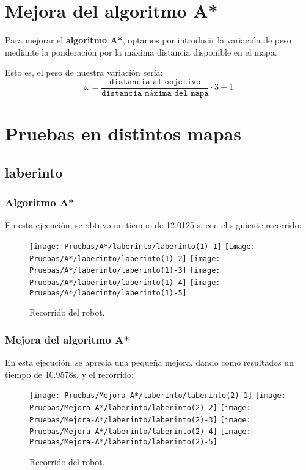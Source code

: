 \documentclass[a4paper, 11pt]{article}
\begin{document}
\section{Mejora del algoritmo A*}
	Para mejorar el \textbf{algoritmo A*}, optamos por introducir la variación de peso mediante la
	ponderación por la máxima distancia disponible en el mapa.
	
	Esto es, el peso de nuestra variación sería:
	$$\omega = \frac{\texttt{distancia al objetivo}}{\texttt{distancia máxima del mapa}} \cdot 3 + 1$$

\section{Pruebas en distintos mapas}
	\subsection{laberinto}
		\subsubsection{Algoritmo A*}
			En esta ejecución, se obtuvo un tiempo de 12.0125 s. con el siguiente recorrido:
			\begin{figure}[H]
				\centering
				\texttt{[image: Pruebas/A*/laberinto/laberinto(1)-1]}
				\texttt{[image: Pruebas/A*/laberinto/laberinto(1)-2]}
				\texttt{[image: Pruebas/A*/laberinto/laberinto(1)-3]}
				\texttt{[image: Pruebas/A*/laberinto/laberinto(1)-4]}
				\texttt{[image: Pruebas/A*/laberinto/laberinto(1)-5]}
				\caption{Recorrido del robot.}
				\label{A-lab}
			\end{figure}
			
		\subsubsection{Mejora del algoritmo A*}
			En esta ejecución, se aprecia una pequeña mejora, dando como resultados un tiempo de 10.9578s.
			y el recorrido: 
			
			\begin{figure}[H]
				\centering
				\texttt{[image: Pruebas/Mejora-A*/laberinto/laberinto(2)-1]}
				\texttt{[image: Pruebas/Mejora-A*/laberinto/laberinto(2)-2]}
				\texttt{[image: Pruebas/Mejora-A*/laberinto/laberinto(2)-3]}
				\texttt{[image: Pruebas/Mejora-A*/laberinto/laberinto(2)-4]}
				\texttt{[image: Pruebas/Mejora-A*/laberinto/laberinto(2)-5]}
				\caption{Recorrido del robot.}
				\label{MA-lab}
			\end{figure}
\end{document}
